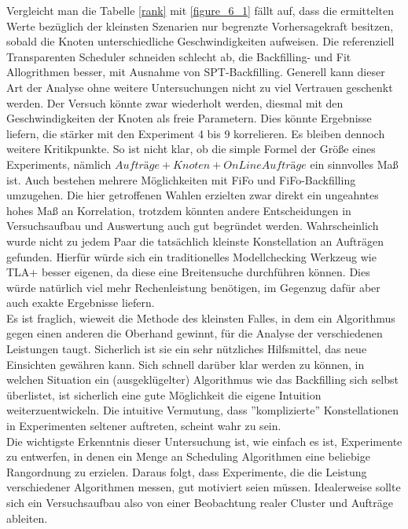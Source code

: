 Vergleicht man die Tabelle \ref{rank} mit \ref{figure_6_1} fällt auf, dass die ermittelten Werte bezüglich der kleinsten Szenarien nur begrenzte Vorhersagekraft besitzen, sobald die Knoten unterschiedliche Geschwindigkeiten aufweisen. Die referenziell Transparenten Scheduler schneiden schlecht ab, die Backfilling- und Fit Allogrithmen besser, mit Ausnahme von SPT-Backfilling. Generell kann dieser Art der Analyse ohne weitere Untersuchungen nicht zu viel Vertrauen geschenkt werden. Der Versuch könnte zwar wiederholt werden, diesmal mit den Geschwindigkeiten der Knoten als freie Parametern. Dies könnte Ergebnisse liefern, die stärker mit den Experiment 4 bis 9 korrelieren. Es bleiben dennoch weitere Kritikpunkte. So ist nicht klar, ob die simple Formel der Größe eines Experiments, nämlich $Aufträge + Knoten + OnLine Aufträge$ ein sinnvolles Maß ist. Auch bestehen mehrere Möglichkeiten mit FiFo und FiFo-Backfilling umzugehen. Die hier getroffenen Wahlen erzielten zwar direkt ein ungeahntes hohes Maß an Korrelation, trotzdem könnten andere Entscheidungen in Versuchsaufbau und Auswertung auch gut begründet werden.
Wahrscheinlich wurde nicht zu jedem Paar die tatsächlich kleinste Konstellation an Aufträgen gefunden. Hierfür würde sich ein traditionelles Modellchecking Werkzeug wie TLA+ besser eigenen, da diese eine Breitensuche durchführen können. Dies würde natürlich viel mehr Rechenleistung benötigen, im Gegenzug dafür aber auch exakte Ergebnisse liefern.\\
Es ist fraglich, wieweit die Methode des kleinsten Falles, in dem ein Algorithmus gegen einen anderen die Oberhand gewinnt, für die Analyse der verschiedenen Leistungen taugt. Sicherlich ist sie ein sehr nützliches Hilfsmittel, das neue Einsichten gewähren kann. Sich schnell darüber klar werden zu können, in welchen Situation ein (ausgeklügelter) Algorithmus wie das Backfilling sich selbst überlistet, ist sicherlich eine gute Möglichkeit die eigene Intuition weiterzuentwickeln. Die intuitive Vermutung, dass ''komplizierte'' Konstellationen in Experimenten seltener auftreten, scheint wahr zu sein.\\

Die wichtigste Erkenntnis dieser Untersuchung ist, wie einfach es ist, Experimente zu entwerfen, in denen ein Menge an Scheduling Algorithmen eine beliebige Rangordnung zu erzielen. Daraus folgt, dass Experimente, die die Leistung verschiedener Algorithmen messen, gut motiviert seien müssen. Idealerweise sollte sich ein Versuchsaufbau also von einer Beobachtung realer Cluster und Aufträge ableiten.

\FloatBarrier

